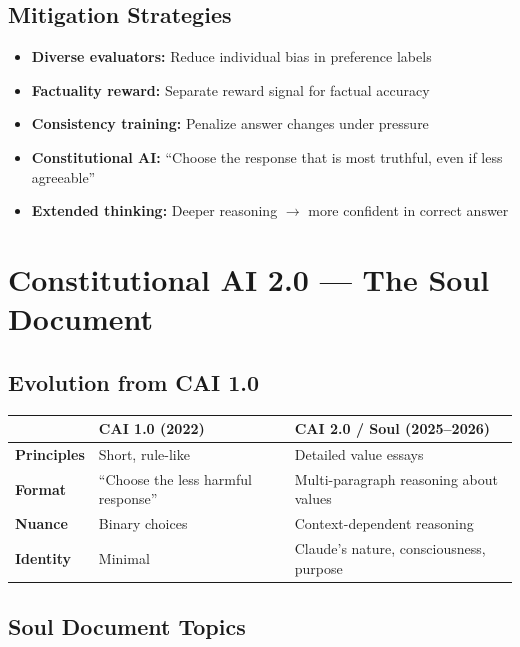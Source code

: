 \documentclass[11pt,a4paper]{article}
\begin{document}
\subsection{Mitigation Strategies}

\begin{itemize}[itemsep=1pt]
  \item \textbf{Diverse evaluators:} Reduce individual bias in preference labels
  \item \textbf{Factuality reward:} Separate reward signal for factual accuracy
  \item \textbf{Consistency training:} Penalize answer changes under pressure
  \item \textbf{Constitutional AI:} ``Choose the response that is most truthful, even if less agreeable''
  \item \textbf{Extended thinking:} Deeper reasoning $\to$ more confident in correct answer
\end{itemize}

\section{Constitutional AI 2.0 --- The Soul Document}

\subsection{Evolution from CAI 1.0}

\begin{center}
\begin{tabular}{lL{6cm}L{6cm}}
\toprule
& \textbf{CAI 1.0 (2022)} & \textbf{CAI 2.0 / Soul (2025--2026)} \\
\midrule
\textbf{Principles} & Short, rule-like & Detailed value essays \\
\textbf{Format} & ``Choose the less harmful response'' & Multi-paragraph reasoning about values \\
\textbf{Nuance} & Binary choices & Context-dependent reasoning \\
\textbf{Identity} & Minimal & Claude's nature, consciousness, purpose \\
\bottomrule
\end{tabular}
\end{center}

\subsection{Soul Document Topics}
\end{document}
